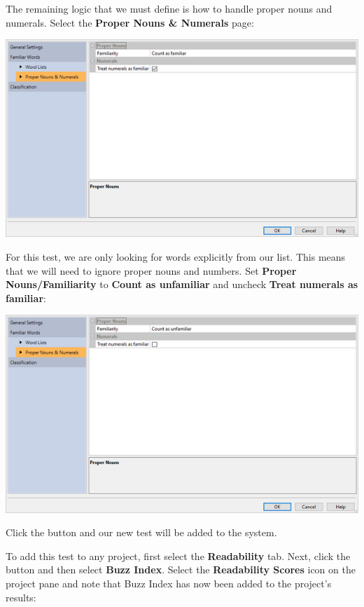 \documentclass[
]{book}
\theoremstyle{definition}
\theoremstyle{definition}
\theoremstyle{definition}
\theoremstyle{definition}
\theoremstyle{remark}
\begin{document}
The remaining logic that we must define is how to handle proper nouns and numerals. Select the \textbf{Proper Nouns \& Numerals} page:

\includegraphics{Images/CustomTestTreat.png}

For this test, we are only looking for words explicitly from our list. This means that we will need to ignore proper nouns and numbers. Set \textbf{Proper Nouns/Familiarity} to \textbf{Count as unfamiliar} and uncheck \textbf{Treat numerals as familiar}:

\includegraphics{Images/CustomIndexTestExampleProperAndNumeralsFinished.png}

Click the  button and our new test will be added to the system.

To add this test to any project, first select the \textbf{Readability} tab. Next, click the  button and then select \textbf{Buzz Index}. Select the \textbf{Readability Scores} icon on the project pane and note that Buzz Index has now been added to the project's results:
\end{document}
